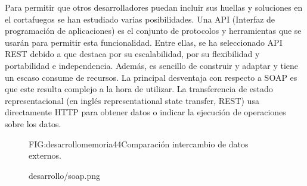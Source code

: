 Para permitir que otros desarrolladores puedan incluir sus huellas y soluciones en el cortafuegos se han estudiado varias posibilidades. Una API  (Interfaz de programación de aplicaciones) es el conjunto de protocolos y herramientas que se usarán para permitir esta funcionalidad. Entre ellas, se ha seleccionado API REST debido a que destaca por su escalabilidad, por su flexibilidad y portabilidad e independencia. Además, es sencillo de construir y adaptar y tiene un escaso consume de recursos. La principal desventaja con respecto a SOAP es que este resulta complejo a la hora de utilizar. La transferencia de estado representacional (en inglés representational state transfer, REST) usa directamente HTTP para obtener datos o indicar la ejecución de operaciones sobre los datos.

\begin{figure}[Comparación intercambio de datos externos.]{FIG:desarrollomemoria44}{Comparación intercambio de datos externos.}
  \begin{image}{}{}{desarrollo/soap.png}
  \end{image}
\end{figure}